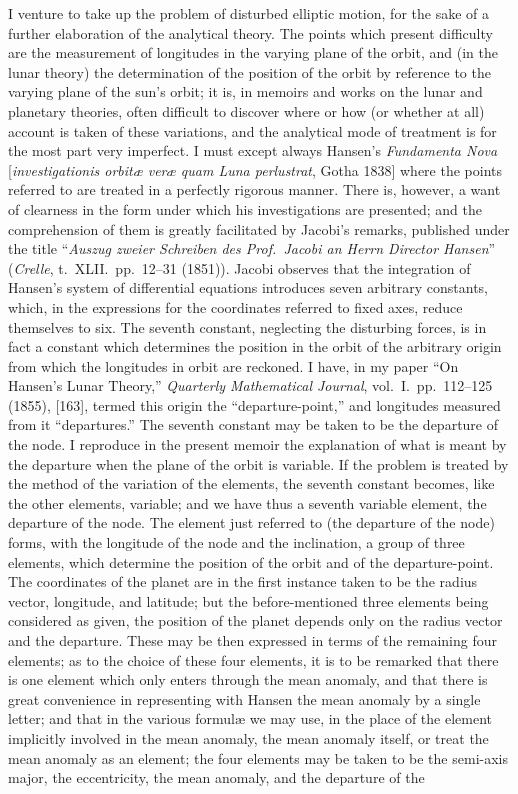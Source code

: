 \documentclass[11pt]{article}
\begin{document}
\medskip

\noindent I venture to take up the problem of disturbed elliptic motion, for the sake of a further elaboration of the analytical theory. The points which present difficulty are the measurement of longitudes in the varying plane of the orbit, and (in the lunar theory) the determination of the position of the orbit by reference to the varying plane of the sun's orbit; it is, in memoirs and works on the lunar and planetary theories, often difficult to discover where or how (or whether at all) account is taken of these variations, and the analytical mode of treatment is for the most part very imperfect. I must except always Hansen's \textit{Fundamenta Nova} [\textit{investigationis orbit{\ae} ver{\ae} quam Luna perlustrat}, Gotha 1838] where the points referred to are treated in a perfectly rigorous manner. There is, however, a want of clearness in the form under which his investigations are presented; and the comprehension of them is greatly facilitated by Jacobi's remarks, published under the title ``\textit{Auszug zweier Schreiben des Prof.\ Jacobi an Herrn Director Hansen}'' (\textit{Crelle}, t.\ XLII.\ pp.\ 12--31 (1851)). Jacobi observes that the integration of Hansen's system of differential equations introduces seven arbitrary constants, which, in the expressions for the coordinates referred to fixed axes, reduce themselves to six. The seventh constant, neglecting the disturbing forces, is in fact a constant which determines the position in the orbit of the arbitrary origin from which the longitudes in orbit are reckoned. I have, in my paper ``On Hansen's Lunar Theory,'' \textit{Quarterly Mathematical Journal}, vol.\ I.\ pp.\ 112--125 (1855), [163], termed this origin the ``departure-point,'' and longitudes measured from it ``departures.'' The seventh constant may be taken to be the departure of the node. I reproduce in the present memoir the explanation of what is meant by the departure when the plane of the orbit is variable. If the problem is treated by the method of the variation of the elements, the seventh constant becomes, like the other elements, variable; and we have thus a seventh variable element, the departure of the node. The element just referred to (the departure of the node) forms, with the longitude of the node and the inclination, a group of three elements, which determine the position of the orbit and of the departure-point. The coordinates of the planet are in the first instance taken to be the radius vector, longitude, and latitude; but the before-mentioned three elements being considered as given, the position of the planet depends only on the radius vector and the departure. These may be then expressed in terms of the remaining four elements; as to the choice of these four elements, it is to be remarked that there is one element which only enters through the mean anomaly, and that there is great convenience in representing with Hansen the mean anomaly by a single letter; and that in the various formul{\ae} we may use, in the place of the element implicitly involved in the mean anomaly, the mean anomaly itself, or treat the mean anomaly as an element; the four elements may be taken to be the semi-axis major, the eccentricity, the mean anomaly, and the departure of the 
\end{document}
